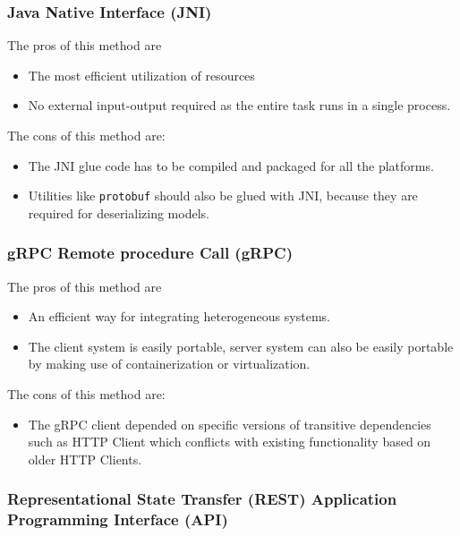 \subsubsection{Java Native Interface (JNI)} \label{sec:eval-jni}

The pros of this method are
\begin{itemize}
	\item The most efficient utilization of resources
	\item No external input-output required as the entire task runs in a single process.
\end{itemize}

The cons of this method are:
\begin{itemize}
	\item The JNI glue code has to be compiled and packaged for all the platforms.
	\item Utilities like \texttt{protobuf} should also be glued with JNI, because they are required for deserializing models\cite{javacpp-240}.
\end{itemize}

\subsubsection{gRPC Remote procedure Call (gRPC)} \label{sec:eval-rpc}

The pros of this method are
\begin{itemize}
	\item An efficient way for integrating heterogeneous systems.
	\item The client system is easily portable, server system can also be easily portable by making use of containerization or virtualization.
\end{itemize}

The cons of this method are:
\begin{itemize}
	\item The gRPC client depended on specific versions of transitive dependencies such as HTTP Client which conflicts with existing functionality based on older HTTP Clients.
\end{itemize}

\subsubsection{Representational State Transfer (REST) Application Programming Interface (API)} \label{sec:eval-rest}

